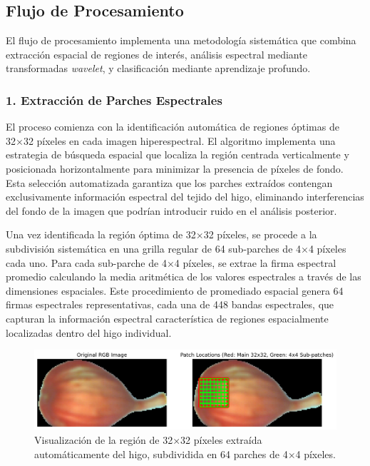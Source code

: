 \subsection{Flujo de Procesamiento}

El flujo de procesamiento implementa una metodología sistemática que combina extracción espacial de regiones de interés, análisis espectral mediante transformadas \emph{wavelet}, y clasificación mediante aprendizaje profundo.

\subsubsection{1. Extracción de Parches Espectrales}

El proceso comienza con la identificación automática de regiones óptimas de 32×32 píxeles en cada imagen hiperespectral. El algoritmo implementa una estrategia de búsqueda espacial que localiza la región centrada verticalmente y posicionada horizontalmente para minimizar la presencia de píxeles de fondo. Esta selección automatizada garantiza que los parches extraídos contengan exclusivamente información espectral del tejido del higo, eliminando interferencias del fondo de la imagen que podrían introducir ruido en el análisis posterior.

\vspace{5mm}

Una vez identificada la región óptima de 32×32 píxeles, se procede a la subdivisión sistemática en una grilla regular de 64 sub-parches de 4×4 píxeles cada uno. Para cada sub-parche de 4×4 píxeles, se extrae la firma espectral promedio calculando la media aritmética de los valores espectrales a través de las dimensiones espaciales. Este procedimiento de promediado espacial genera 64 firmas espectrales representativas, cada una de 448 bandas espectrales, que capturan la información espectral característica de regiones espacialmente localizadas dentro del higo individual.

\begin{figure}[ht]
\centering
\includegraphics[width=\textwidth]{images/patch_visualization_Fx10_20230717_Riego_C0_2023-07-17_09-02-21_ann0.png}
\caption{Visualización de la región de 32×32 píxeles extraída automáticamente del higo, subdividida en 64 parches de 4×4 píxeles.}
\label{fig:patch_extraction_example}
\end{figure}


